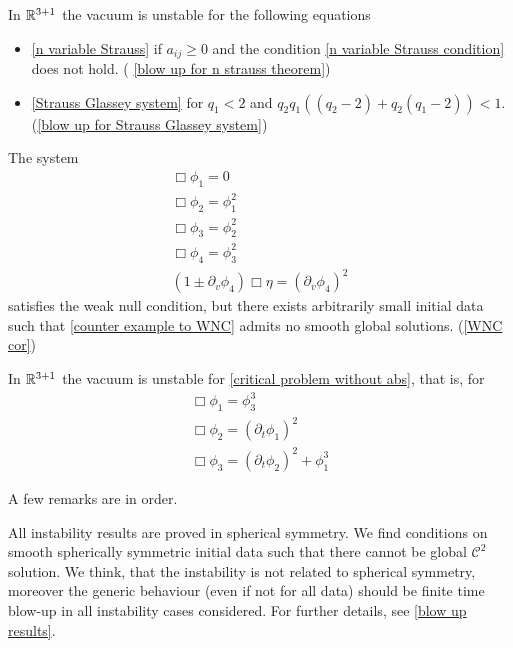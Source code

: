 \documentclass[11pt, oneside]{amsart}
\begin{document}
	\begin{theorem*}
		In $\mathbb{R}^{3+1}$ the vacuum is unstable for the following equations
		\begin{itemize}
			\item \eqref{n variable Strauss} if $a_{ij}\geq0$ and the condition \eqref{n variable Strauss condition} does not hold. ( \cref{blow up for n strauss theorem})
			\item  \eqref{Strauss Glassey system} for $q_1<2$ and $q_2q_1((q_2-2)+q_2(q_1-2))<1$. (\cref{blow up for Strauss Glassey system})
			\end{itemize}
	
		The system 
	\begin{equation}\label{counter example to WNC}
		\begin{gathered}
			\Box\phi_1=0\\
			\Box\phi_2=\phi_1^2\\
			\Box\phi_3=\phi_2^2\\
			\Box\phi_4=\phi_3^2\\
			(1\pm\partial_v\phi_4)\Box\eta=(\partial_v\phi_4)^2
		\end{gathered}
	\end{equation}
	satisfies the weak null condition, but there exists arbitrarily small initial data such that \cref{counter example to WNC} admits no smooth global solutions. (\cref{WNC cor})
	\end{theorem*}

	\begin{theorem*}
		In $\mathbb{R}^{3+1}$ the vacuum is unstable for \cref{critical problem without abs}, that is, for
		\begin{equation*}
			\begin{gathered}
				\Box\phi_1=\phi_3^3\\
				\Box\phi_2=(\partial_t\phi_1)^2\\
				\Box\phi_3=(\partial_t\phi_2)^2+\phi_1^3
			\end{gathered}
		\end{equation*}	
	\end{theorem*}

	A few remarks are in order.
	\begin{remark}
		All instability results are proved in spherical symmetry. We find conditions on smooth spherically symmetric initial data such that there cannot be global $\mathcal{C}^2$ solution. We think, that the instability is not related to spherical symmetry, moreover the generic behaviour (even if not for all data) should be finite time blow-up in all instability cases considered. For further details, see \cref{blow up results}.
	\end{remark}
\end{document}
